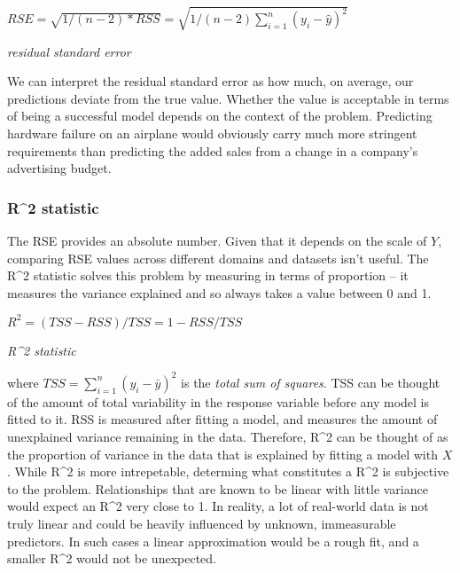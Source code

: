 \documentclass[]{book}
\theoremstyle{definition}
\theoremstyle{definition}
\theoremstyle{definition}
\theoremstyle{remark}
\begin{document}
\(RSE = \sqrt{1/(n-2)*RSS} = \sqrt{1/(n-2)\sum_{i=1}^{n}(y_i - \hat y)^2}\)

\emph{residual standard error}

We can interpret the residual standard error as how much, on average,
our predictions deviate from the true value. Whether the value is
acceptable in terms of being a successful model depends on the context
of the problem. Predicting hardware failure on an airplane would
obviously carry much more stringent requirements than predicting the
added sales from a change in a company's advertising budget.

\subsubsection{R\^{}2 statistic}\label{r2-statistic}

The RSE provides an absolute number. Given that it depends on the scale
of \(Y\), comparing RSE values across different domains and datasets
isn't useful. The R\^{}2 statistic solves this problem by measuring in
terms of proportion -- it measures the variance explained and so always
takes a value between 0 and 1.

\(R^2 = (TSS - RSS)/TSS = 1 - RSS/TSS\)

\emph{R\^{}2 statistic}

where \(TSS = \sum_{i=1}^{n}(y_i-\bar y)^2\) is the \emph{total sum of
squares}. TSS can be thought of the amount of total variability in the
response variable before any model is fitted to it. RSS is measured
after fitting a model, and measures the amount of unexplained variance
remaining in the data. Therefore, R\^{}2 can be thought of as the
proportion of variance in the data that is explained by fitting a model
with \(X\). While R\^{}2 is more intrepetable, determing what
constitutes a R\^{}2 is subjective to the problem. Relationships that
are known to be linear with little variance would expect an R\^{}2 very
close to 1. In reality, a lot of real-world data is not truly linear and
could be heavily influenced by unknown, immeasurable predictors. In such
cases a linear approximation would be a rough fit, and a smaller R\^{}2
would not be unexpected.
\end{document}
